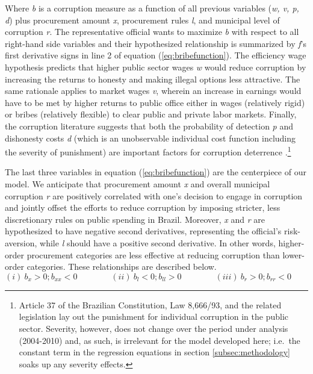 \documentclass[11pt]{article}
\begin{document}
Where \emph{b} is a corruption measure as a function of all previous variables (\emph{w, v, p, d}) plus procurement amount \emph{x}, procurement rules \emph{l}, and municipal level of corruption \emph{r}. The representative official wants to maximize \emph{b} with respect to all right-hand side variables and their hypothesized relationship is summarized by \emph{f}'s first derivative signs in line 2 of equation (\ref{eq:bribefunction}). The efficiency wage hypothesis predicts that higher public sector wages \emph{w} would reduce corruption by increasing the returns to honesty and making illegal options less attractive. The same rationale applies to market wages \emph{v}, wherein an increase in earnings would have to be met by higher returns to public office either in wages (relatively rigid) or bribes (relatively flexible) to clear public and private labor markets. Finally, the corruption literature suggests that both the probability of detection \emph{p} and dishonesty costs \emph{d} (which is an unobservable individual cost function including the severity of punishment) are important factors for corruption deterrence \citep{BeckerCrimePunishmentEconomic1968,Rose-AckermanEconomicsCorruption1975}.\footnote{Article 37 of the Brazilian Constitution, Law 8,666/93, and the related legislation lay out the punishment for individual corruption in the public sector. Severity, however, does not change over the period under analysis (2004-2010) and, as such, is irrelevant for the model developed here; i.e.~the constant term in the regression equations in section \ref{subsec:methodology} soaks up any severity effects.}

The last three variables in equation (\ref{eq:bribefunction}) are the centerpiece of our model. We anticipate that  procurement amount \emph{x} and overall municipal corruption \emph{r} are positively correlated with one's decision to engage in corruption and jointly offset the efforts to reduce corruption by imposing stricter, less discretionary rules on public spending in Brazil. Moreover, \emph{x} and \emph{r} are hypothesized to have negative second derivatives, representing the official's risk-aversion, while \emph{l} should have a positive second derivative. In other words, higher-order procurement categories are less effective at reducing corruption than lower-order categories. These relationships are described below.
\begin{equation} \label{eq:derivatives}
  (i) \   b_{x} > 0; b_{xx} < 0 \qquad \qquad
  (ii) \  b_{l} < 0; b_{ll} > 0 \qquad \qquad
  (iii) \ b_{r} > 0; b_{rr} < 0 \qquad \qquad
\end{equation}
\end{document}
